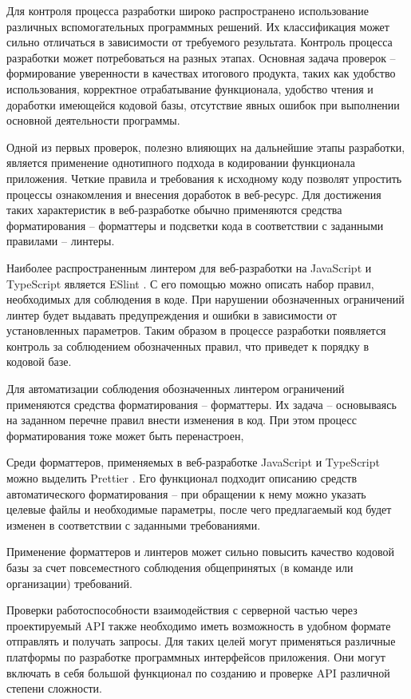 Для контроля процесса разработки широко распространено использование различных вспомогательных программных решений.
Их классификация может сильно отличаться в зависимости от требуемого результата.
Контроль процесса разработки может потребоваться на разных этапах.
Основная задача проверок -- формирование уверенности в качествах итогового продукта, таких как удобство использования, корректное отрабатывание функционала, удобство чтения и доработки имеющейся кодовой базы, отсутствие явных ошибок при выполнении основной деятельности программы.

Одной из первых проверок, полезно влияющих на дальнейшие этапы разработки, является применение однотипного подхода в кодировании функционала приложения.
Четкие правила и требования к исходному коду позволят упростить процессы ознакомления и внесения доработок в веб-ресурс.
Для достижения таких  характеристик в веб-разработке обычно применяются средства форматирования -- форматтеры и подсветки кода в соответствии с заданными правилами -- линтеры.

Наиболее распространенным линтером для веб-разработки на JavaScript и TypeScript является ESlint \cite{eslint}.
С его помощью можно описать набор правил, необходимых для соблюдения в коде.
При нарушении обозначенных ограничений линтер будет выдавать предупреждения и ошибки в зависимости от установленных параметров.
Таким образом в процессе разработки появляется контроль за соблюдением обозначенных правил, что приведет к порядку в кодовой базе.

Для автоматизации соблюдения обозначенных линтером ограничений применяются средства форматирования -- форматтеры.
Их задача -- основываясь на заданном перечне правил внести изменения в код.
При этом процесс форматирования тоже может быть перенастроен,

Среди форматтеров, применяемых в веб-разработке JavaScript и TypeScript можно выделить Prettier \cite{prettier}.
Его функционал подходит описанию средств автоматического форматирования -- при обращении к нему можно указать целевые файлы и необходимые параметры, после чего предлагаемый код будет изменен в соответствии с заданными требованиями.

Применение форматтеров и линтеров может сильно повысить качество кодовой базы за счет повсеместного соблюдения общепринятых (в команде или организации) требований.

Проверки работоспособности взаимодействия с серверной частью через проектируемый API также необходимо иметь возможность в удобном формате отправлять и получать запросы.
Для таких целей могут применяться различные платформы по разработке программных интерфейсов приложения.
Они могут включать в себя большой функционал по созданию и проверке API различной степени сложности.

